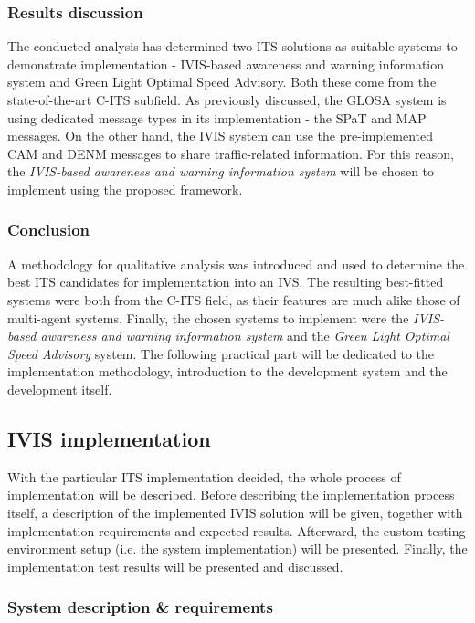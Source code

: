 \documentclass[main.tex]{subfiles}
\begin{document}
\subsubsection{Results discussion}

The conducted analysis has determined two ITS solutions as suitable systems to demonstrate 
implementation - IVIS-based awareness and warning information system and Green
Light Optimal Speed Advisory. Both these come from the state-of-the-art C-ITS subfield. As 
previously discussed, the GLOSA system is using dedicated message types in its implementation -
the SPaT and MAP messages. On the other hand, the IVIS system can use the pre-implemented 
CAM and DENM messages to share traffic-related information. For this reason, the 
\emph{IVIS-based awareness and warning information system} will be chosen to implement 
using the proposed framework.

\subsubsection{Conclusion}

A methodology for qualitative analysis was introduced and used to
determine the best ITS candidates for implementation into an IVS. The resulting best-fitted
systems were both from the C-ITS field, as their features are much alike those of multi-agent
systems. Finally, the chosen systems to implement were the \emph{IVIS-based awareness and
warning information system} and the \emph{Green Light Optimal Speed Advisory} system. The
following practical part will be dedicated to the implementation methodology, introduction to
the development system and the development itself.

\subsection{IVIS implementation}

With the particular ITS implementation decided, the whole process of implementation will be 
described. Before describing the implementation process itself, a description of the 
implemented IVIS solution will be given, together with implementation requirements and expected
results. Afterward, the custom testing environment setup (i.e. the system implementation) will %
be presented. Finally, the implementation test results will be presented and discussed.

\subsubsection{System description \& requirements}
\end{document}
